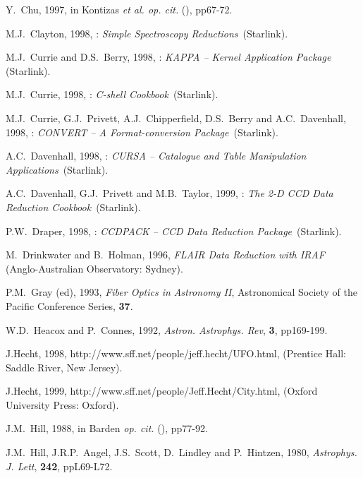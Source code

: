 \documentclass[chapters,twoside,11pt]{starlink}
\begin{document}
\begin{thebibliography}{99}
   Y.~Chu, 1997, in Kontizas \textit{et al. op. cit.}\/
   (\cite{KONTIZAS97}), pp67-72.

   M.J.~Clayton, 1998, : \textit{Simple
   Spectroscopy Reductions}\, (Starlink).

   M.J.~Currie and D.S.~Berry, 1998, :
   \textit{KAPPA -- Kernel Application Package}\, (Starlink).

   M.J.~Currie, 1998, : \textit{C-shell
   Cookbook}\, (Starlink).

   M.J.~Currie, G.J.~Privett, A.J.~Chipperfield,
   D.S.~Berry and A.C.~Davenhall, 1998, :
   \textit{CONVERT -- A Format-conversion Package}\, (Starlink).

   A.C.~Davenhall, 1998, :
   \textit{CURSA -- Catalogue and Table Manipulation Applications}\, (Starlink).

   A.C.~Davenhall, G.J.~Privett and M.B.~Taylor, 1999,
   : \textit{The 2-D CCD Data Reduction Cookbook}\,
   (Starlink).

   P.W.~Draper, 1998, : \textit{CCDPACK -- CCD Data Reduction Package}\, (Starlink).

   M.~Drinkwater and B.~Holman, 1996, \textit{FLAIR Data
   Reduction with IRAF}\, (Anglo-Australian Observatory: Sydney).

   P.M.~Gray (ed), 1993, \textit{Fiber Optics in Astronomy
   II}, Astronomical Society of the Pacific Conference Series,
   \textbf{37}.

   W.D.~Heacox and P.~Connes, 1992, \textit{Astron.
   Astrophys. Rev}, \textbf{3}, pp169-199.

   J.Hecht, 1998,
   {http://www.sff.net/people/jeff.hecht/UFO.html},
   (Prentice Hall: Saddle River, New Jersey).

   J.Hecht, 1999,
   {http://www.sff.net/people/Jeff.Hecht/City.html},
   (Oxford University Press: Oxford).

   J.M.~Hill, 1988, in Barden \textit{op. cit.}\/
   (\cite{BARDEN88}), pp77-92.

   J.M.~Hill, J.R.P.~Angel, J.S.~Scott, D.~Lindley and
   P.~Hintzen, 1980, \textit{Astrophys. J. Lett}, \textbf{242}, ppL69-L72.


\end{thebibliography}
\end{document}
